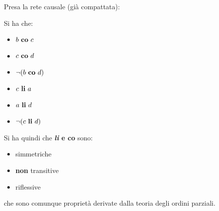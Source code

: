 \begin{esempio}
  Presa la rete causale (già compattata):
  \begin{figure}[H]
    \centering
  \end{figure}
  Si ha che:
  \begin{itemize}
    \item $b \mbox{ \textbf{co} }c$
    \item $c \mbox{ \textbf{co} }d$
    \item $\neg (b \mbox{ \textbf{co} }d)$
    \item $c \mbox{ \textbf{li} }a$
    \item $a \mbox{ \textbf{li} }d$
    \item $\neg (c \mbox{ \textbf{li} }d)$
  \end{itemize}
\end{esempio}
Si ha quindi che \textbf{\textit{li} \textnormal{e} co} sono:
\begin{itemize}
  \item simmetriche
  \item \textbf{non} transitive
  \item riflessive
\end{itemize}
che sono comunque proprietà derivate dalla teoria degli ordini parziali.\\
